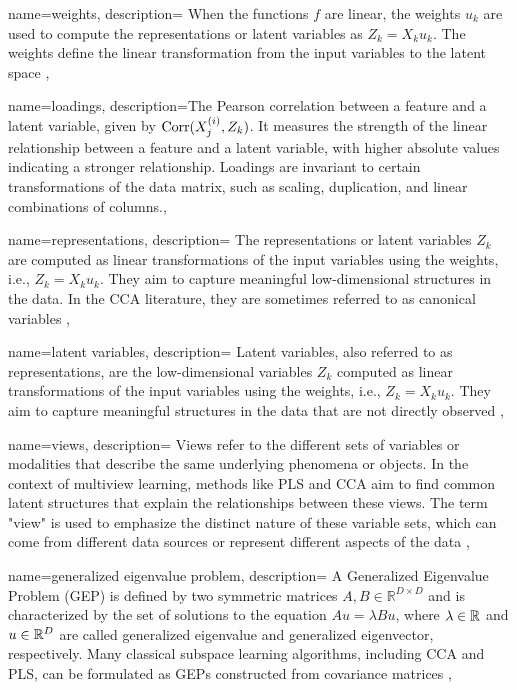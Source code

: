  {
name={weights},
description={
When the functions $f$ are linear, the weights $u_k$ are used to compute the representations or latent variables as $Z_k = X_k u_k$. The weights define the linear transformation from the input variables to the latent space
},
}

 {
name={loadings},
description={The Pearson correlation between a feature and a latent variable, given by $\operatorname{Corr}(X^{(i)}_j, Z_k)$. It measures the strength of the linear relationship between a feature and a latent variable, with higher absolute values indicating a stronger relationship. Loadings are invariant to certain transformations of the data matrix, such as scaling, duplication, and linear combinations of columns.},
}

 {
name={representations},
description={
The representations or latent variables $Z_k$ are computed as linear transformations of the input variables using the weights, i.e., $Z_k = X_k u_k$. They aim to capture meaningful low-dimensional structures in the data. In the CCA literature, they are sometimes referred to as canonical variables
},
}

 {
name={latent variables},
description={
Latent variables, also referred to as representations, are the low-dimensional variables $Z_k$ computed as linear transformations of the input variables using the weights, i.e., $Z_k = X_k u_k$. They aim to capture meaningful structures in the data that are not directly observed
},
}

 {
name={views},
description={
Views refer to the different sets of variables or modalities that describe the same underlying phenomena or objects. In the context of multiview learning, methods like PLS and CCA aim to find common latent structures that explain the relationships between these views. The term "view" is used to emphasize the distinct nature of these variable sets, which can come from different data sources or represent different aspects of the data
},
}

 {
name={generalized eigenvalue problem},
description={
A Generalized Eigenvalue Problem (GEP) is defined by two symmetric matrices $A,B\in \mathbb{R}^{D\times D}$ and is characterized by the set of solutions to the equation $Au=\lambda Bu$, where $\lambda \in \mathbb{R}$ and $u \in \mathbb{R}^D$ are called generalized eigenvalue and generalized eigenvector, respectively. Many classical subspace learning algorithms, including CCA and PLS, can be formulated as GEPs constructed from covariance matrices
},
}

